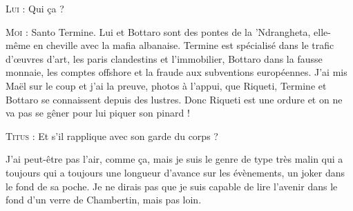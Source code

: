 \begin{dialogue}
\textsc{Lui} : Qui ça ?

\textsc{Moi} : Santo Termine. Lui et Bottaro sont des pontes de la ’Ndrangheta, elle-même en cheville avec la mafia albanaise. Termine est spécialisé dans le trafic d’œuvres d’art, les paris clandestins et l’immobilier, Bottaro dans la fausse monnaie, les comptes offshore et la fraude aux subventions européennes. J’ai mis Maël sur le coup et j’ai la preuve, photos à l’appui, que Riqueti, Termine et Bottaro se connaissent depuis des lustres. Donc Riqueti est une ordure et on ne va pas se gêner pour lui piquer son pinard !

\textsc{Titus} : Et s’il rapplique avec son garde du corps ?

\end{dialogue}

J’ai peut-être pas l’air, comme ça, mais je suis le genre de type très malin qui a toujours qui a toujours une longueur d’avance sur les évènements, un joker dans le fond de sa poche. Je ne dirais pas que je suis capable de lire l’avenir dans le fond d’un verre de Chambertin, mais pas loin.

